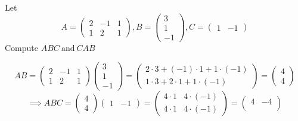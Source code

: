 \documentclass[a4paper, 10pt]{article}
\begin{document}
\begin{problem} 
Let \[
    A = \begin{pmatrix}
            2 & -1 & 1 \\
            1 & 2  & 1
        \end{pmatrix},
    B = \begin{pmatrix}
            3 \\
            1 \\
            -1
        \end{pmatrix},
    C = \begin{pmatrix}
            1 & -1
        \end{pmatrix}
\]
Compute \(ABC \:\text{and}\:  CAB\)
\end{problem}
\begin{solution}
    \[
        AB = \begin{pmatrix}
                2 & -1 & 1 \\
                1 & 2  & 1
            \end{pmatrix}\begin{pmatrix}
                3 \\
                1 \\
                -1
            \end{pmatrix} =
        \begin{pmatrix}
                2 \cdot 3 + (-1) \cdot 1 + 1 \cdot (-1) \\
                1 \cdot 3 + 2 \cdot 1 + 1 \cdot (-1)
            \end{pmatrix} =
        \begin{pmatrix}
                4 \\
                4
            \end{pmatrix}
    \]
    \[
        \implies ABC = \begin{pmatrix}
                4 \\
                4
            \end{pmatrix} \begin{pmatrix}
                1 & -1
            \end{pmatrix} =
        \begin{pmatrix}
                4 \cdot 1 & 4 \cdot (-1) \\
                4 \cdot 1 & 4 \cdot (-1)
            \end{pmatrix} =
        \begin{pmatrix}
                4 & -4 \\

\end{pmatrix}\]
\end{solution}
\end{document}
